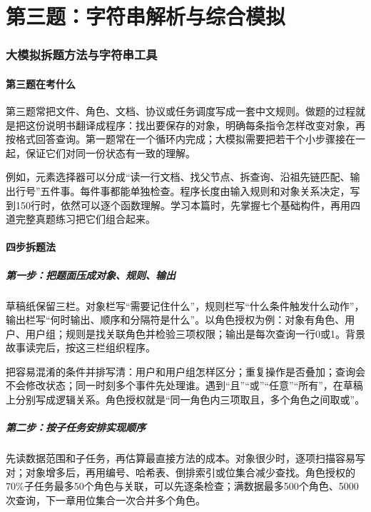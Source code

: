 \documentclass[UTF8,11pt,a4paper,fontset=none]{ctexart}
\begin{document}
\clearpage
\part{第三题：字符串解析与综合模拟}
\section{大模拟拆题方法与字符串工具}
\subsection{第三题在考什么}
第三题常把文件、角色、文档、协议或任务调度写成一套中文规则。做题的过程就是把这份说明书翻译成程序：找出要保存的对象，明确每条指令怎样改变对象，再按格式回答查询。第一题常在一个循环内完成；大模拟需要把若干个小步骤接在一起，保证它们对同一份状态有一致的理解。

例如，元素选择器可以分成“读一行文档、找父节点、拆查询、沿祖先链匹配、输出行号”五件事。每件事都能单独检查。程序长度由输入规则和对象关系决定，写到150行时，依然可以逐个函数理解。学习本篇时，先掌握七个基础构件，再用四道完整真题练习把它们组合起来。

\subsection{四步拆题法}
\subsubsection{第一步：把题面压成对象、规则、输出}
草稿纸保留三栏。对象栏写“需要记住什么”，规则栏写“什么条件触发什么动作”，输出栏写“何时输出、顺序和分隔符是什么”。以角色授权为例：对象有角色、用户、用户组；规则是找关联角色并检验三项权限；输出是每次查询一行0或1。背景故事读完后，按这三栏组织程序。

把容易混淆的条件并排写清：用户和用户组怎样区分；重复操作是否叠加；查询会不会修改状态；同一时刻多个事件先处理谁。遇到“且”“或”“任意”“所有”，在草稿上分别写成逻辑关系。角色授权就是“同一角色内三项取且，多个角色之间取或”。

\subsubsection{第二步：按子任务安排实现顺序}
先读数据范围和子任务，再估算最直接方法的成本。对象很少时，逐项扫描容易写对；对象增多后，再用编号、哈希表、倒排索引或位集合减少查找。角色授权的70\%子任务最多50个角色与关联，可以先逐条检查；满数据最多500个角色、5000次查询，下一章用位集合一次合并多个角色。
\end{document}
